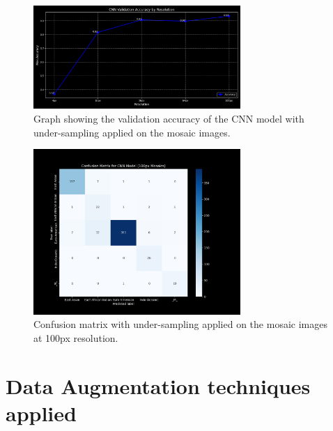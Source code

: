 \begin{appendices}
	\begin{figure}[H]
		\centering
		\includegraphics[width=0.7\textwidth]{../imgs/graphs/kfold-undersample/cnn_validation_accuracy_kfold_mosaics_line_mask_5_undersample.png}
		\caption{Graph showing the validation accuracy of the CNN model with under-sampling applied on the mosaic images.}
		\label{fig:under_sampling_mosaic_accuracy}
	\end{figure}

	\begin{figure}[H]
		\centering
		\includegraphics[width=0.7\textwidth]{../imgs/graphs/kfold-undersample/cnn_confusion_matrix_kfold_mosaics_100px_mask_5_undersample.png}
		\caption{Confusion matrix with under-sampling applied on the mosaic images at 100px resolution.}
		\label{fig:under_sampling_mosaic_confusion_matrix}
	\end{figure}

	\section{Data Augmentation techniques applied}
	\label{app:data_augmentation}


\end{appendices}
